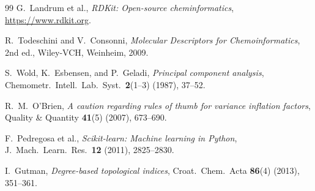 \documentclass[11pt,a4paper]{article}
\theoremstyle{definition}
\begin{document}
\begin{thebibliography}{99}
G.~Landrum et al.,
\emph{RDKit: Open-source cheminformatics},
\url{https://www.rdkit.org}.

R.~Todeschini and V.~Consonni,
\emph{Molecular Descriptors for Chemoinformatics}, 2nd ed.,
Wiley-VCH, Weinheim, 2009.

S.~Wold, K.~Esbensen, and P.~Geladi,
\emph{Principal component analysis},
Chemometr.~Intell.~Lab.~Syst.~\textbf{2}(1--3) (1987), 37--52.

R.~M.~O'Brien,
\emph{A caution regarding rules of thumb for variance inflation factors},
Quality \& Quantity \textbf{41}(5) (2007), 673--690.

F.~Pedregosa et al.,
\emph{Scikit-learn: Machine learning in Python},
J.~Mach.~Learn.~Res.~\textbf{12} (2011), 2825--2830.

I.~Gutman,
\emph{Degree-based topological indices},
Croat.~Chem.~Acta \textbf{86}(4) (2013), 351--361.

\end{thebibliography}
\end{document}
